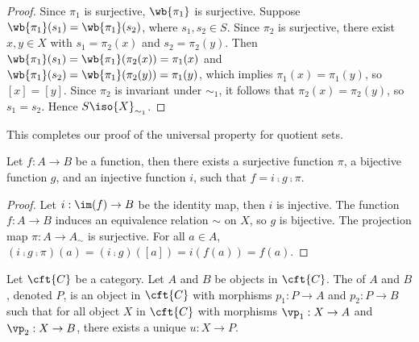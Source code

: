 \documentclass[10pt]{article}
\begin{document}
\begin{center}
\end{center}
\begin{proof}
    Since ${\pi}_{1}$ is surjective, $\wb{{\pi}_{1}}$ is surjective. Suppose $\wb{{\pi}_{1}}({s}_{1})=\wb{{\pi}_{1}}({s}_{2})$, where ${s}_{1}, {s}_{2}\in S$. Since $\pi_2$ is surjective, there exist $x,y\in X$ with ${s}_{1}={\pi}_{2}(x)$ and ${s}_{2}={\pi}_{2}(y)$. Then $\wb{{\pi}_{1}}({s}_{1})=\wb{{\pi}_{1}}({\pi}_{2}(x))={\pi}_{1}(x)$ and $\wb{{\pi}_{1}}({s}_{2})=\wb{{\pi}_{1}}({\pi}_{2}(y))={\pi}_{1}(y)$, which implies ${\pi}_{1}(x)={\pi}_{1}(y)$, so $[x]=[y]$. Since ${\pi}_{2}$ is invariant under ${\sim}_{1}$, it follows that ${\pi}_{2}(x)={\pi}_{2}(y)$, so ${s}_{1}={s}_{2}$. Hence $S\iso{X}_{{\sim}_{1}}$.        
\end{proof}
\par
This completes our proof of the universal property for quotient sets.
\begin{theorem}
    Let $f:A\to B$ be a function, then there exists a surjective function $\pi$, a bijective function $g$, and an injective function $i$, such that $f=i\comp g\comp\pi$.
\end{theorem}
\begin{center}
\end{center}
\begin{proof}
    Let $i:\im(f)\to B$ be the identity map, then $i$ is injective. The function $f:A\to B$ induces an equivalence relation $\sim$ on $X$, so $g$ is bijective. The projection map $\pi:A\to{A}_{\sim}$ is surjective. For all $a\in A$, $(i\comp g\comp\pi)(a)=(i\comp g)([a])=i(f(a))=f(a)$. 
\end{proof}
\begin{definition}
    Let $\cft{C}$ be a category. Let $A$ and $B$ be objects in $\cft{C}$. The  of $A$ and $B$, denoted $P$, is an object in $\cft{C}$ with morphisms ${p}_{1}:P\to A$ and ${p}_{2}:P\to B$ such that for all object $X$ in $\cft{C}$ with morphisms ${\vp}_{1}:X\to A$ and ${\vp}_{2}:X\to B$, there exists a unique $u:X\to P$.
\end{definition}
\end{document}

